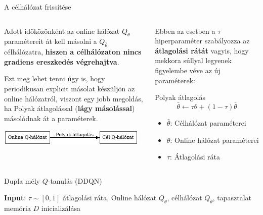\documentclass[english, aspectratio=169]{beamer}
\begin{document}
\begin{frame}{A célhálózat frissítése}
\begin{columns}
\begin{column}{.5\textwidth}
Adott időközönként az online hálózat $Q_\theta$ paramétereit át kell másolni a $Q_{\bar{\theta}}$ célhálózatra, \textbf{hiszen a célhálózaton nincs gradiens ereszkedés végrehajtva}.\par\smallskip
Ezt meg lehet tenni úgy is, hogy periodikusan explicit másolat készüljön az online hálózatról, viszont egy jobb megoldás, ha Polyak átlagolással (\textbf{lágy másolással}) másolódnak át a paraméterek.\par\smallskip
\begin{center}
\includegraphics[width=7cm, keepaspectratio]{graphs/dql_4.png}
\end{center}
\end{column}
\begin{column}{.5\textwidth}
Ebben az esetben a $\tau$ hiperparaméter szabályozza az \textbf{átlagolási rátát} vagyis, hogy mekkora súllyal legyenek figyelembe véve az új paraméterek:
\begin{block}{Polyak átlagolás}
\[
\bar{\theta} \leftarrow \tau \theta + (1 - \tau) \bar{\theta}
\]
\vspace{-0.5cm}
\begin{itemize}
	\item $\bar{\theta}$: Célhálózat paraméterei
	\item $\theta$: Online hálózat paraméterei
	\item $\tau$: Átlagolási ráta
\end{itemize}
\end{block}
\end{column}
\end{columns}
\end{frame}

\begin{frame}{}
\begin{algorithm}[H]
\caption{Dupla mély $Q$-tanulás (DDQN)}
\SetAlgoLined
\textbf{Input}: $\tau \sim [0,1]$ átlagolási ráta,
Online hálózat $Q_\theta$, célhálózat $Q_{\bar{\theta}}$, tapasztalat memória $D$ inicializálása\;
\end{algorithm}
\end{frame}
\end{document}
